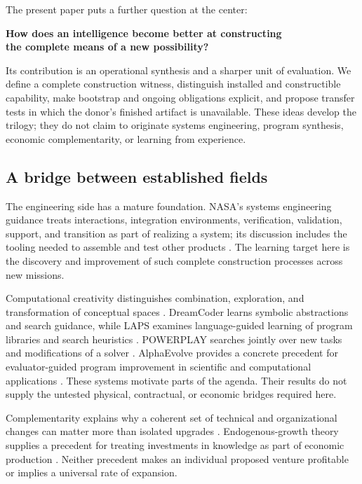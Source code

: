 The present paper puts a further question at the center:
\begin{center}
\large\color{Plum}\textbf{How does an intelligence become better at constructing\\the complete means of a new possibility?}
\end{center}
Its contribution is an operational synthesis and a sharper unit of evaluation. We define a complete construction witness, distinguish installed and constructible capability, make bootstrap and ongoing obligations explicit, and propose transfer tests in which the donor's finished artifact is unavailable. These ideas develop the trilogy; they do not claim to originate systems engineering, program synthesis, economic complementarity, or learning from experience.

\subsection{A bridge between established fields}

The engineering side has a mature foundation. NASA's systems engineering guidance treats interactions, integration environments, verification, validation, support, and transition as part of realizing a system; its discussion includes the tooling needed to assemble and test other products \citep{nasaSE}. The learning target here is the discovery and improvement of such complete construction processes across new missions.

Computational creativity distinguishes combination, exploration, and transformation of conceptual spaces \citep{boden1998}. DreamCoder learns symbolic abstractions and search guidance, while LAPS examines language-guided learning of program libraries and search heuristics \citep{ellis2020,wong2021}. POWERPLAY searches jointly over new tasks and modifications of a solver \citep{schmidhuber2011}. AlphaEvolve provides a concrete precedent for evaluator-guided program improvement in scientific and computational applications \citep{novikov2025}. These systems motivate parts of the agenda. Their results do not supply the untested physical, contractual, or economic bridges required here.

Complementarity explains why a coherent set of technical and organizational changes can matter more than isolated upgrades \citep{milgrom1990}. Endogenous-growth theory supplies a precedent for treating investments in knowledge as part of economic production \citep{romer1990}. Neither precedent makes an individual proposed venture profitable or implies a universal rate of expansion.

